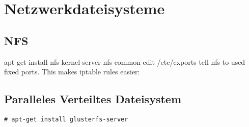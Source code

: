 \chapter{Netzwerkdateisysteme}
\section{NFS}
apt-get install nfs-kernel-server nfs-common
edit /etc/exports
tell nfs to used fixed ports. This makes iptable rules easier:

\section{Paralleles Verteiltes Dateisystem}
\begin{lstlisting}[style=Bash]
# apt-get install glusterfs-server
\end{lstlisting}
